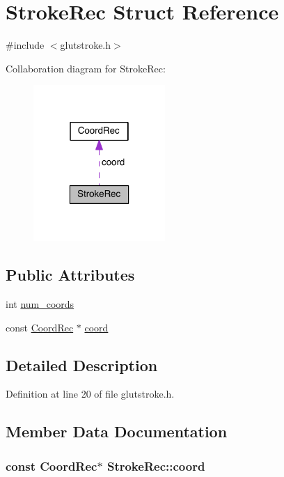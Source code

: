 \hypertarget{struct_stroke_rec}{\section{Stroke\-Rec Struct Reference}
\label{struct_stroke_rec}
}


{\ttfamily \#include $<$glutstroke.\-h$>$}



Collaboration diagram for Stroke\-Rec\-:
\nopagebreak
\begin{figure}[H]
\begin{center}
\leavevmode
\includegraphics[width=142pt]{struct_stroke_rec__coll__graph}
\end{center}
\end{figure}
\subsection*{Public Attributes}
\begin{DoxyCompactItemize}
\item 
int \hyperlink{struct_stroke_rec_a04099f831b56c1f4ff6e12e853eb812f}{num\-\_\-coords}
\item 
const \hyperlink{struct_coord_rec}{Coord\-Rec} $\ast$ \hyperlink{struct_stroke_rec_a5894ac98ad9f7553c249abd5b65b2567}{coord}
\end{DoxyCompactItemize}


\subsection{Detailed Description}


Definition at line 20 of file glutstroke.\-h.



\subsection{Member Data Documentation}
\hypertarget{struct_stroke_rec_a5894ac98ad9f7553c249abd5b65b2567}{
\subsubsection[{coord}]{\setlength{\rightskip}{0pt plus 5cm}const {\bf Coord\-Rec}$\ast$ Stroke\-Rec\-::coord}}\label{struct_stroke_rec_a5894ac98ad9f7553c249abd5b65b2567}



